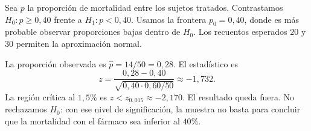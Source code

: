 Sea $p$ la proporción de mortalidad entre los sujetos tratados. Contrastamos $H_0:p\ge0{,}40$ frente a $H_1:p<0{,}40$. Usamos la frontera $p_0=0{,}40$, donde es más probable observar proporciones bajas dentro de $H_0$. Los recuentos esperados $20$ y $30$ permiten la aproximación normal.

La proporción observada es $\hat p=14/50=0{,}28$. El estadístico es
\[
z=\frac{0{,}28-0{,}40}{\sqrt{0{,}40\cdot0{,}60/50}}
\approx-1{,}732.
\]
La región crítica al $1{,}5\%$ es $z<z_{0{,}015}\approx-2{,}170$. El resultado queda fuera. No rechazamos $H_0$: con ese nivel de significación, la muestra no basta para concluir que la mortalidad con el fármaco sea inferior al $40\%$.

